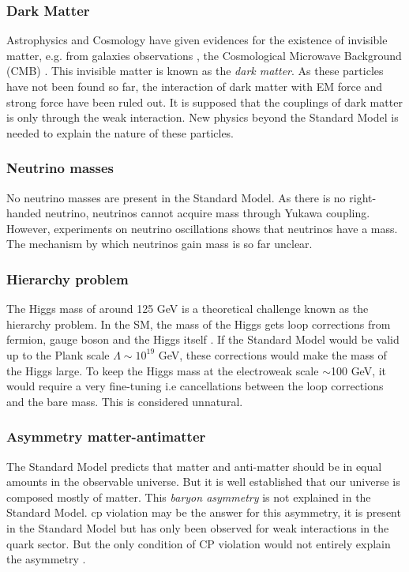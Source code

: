 \subsubsection*{Dark Matter}

Astrophysics and Cosmology have given evidences for the existence of invisible matter, e.g. from galaxies observations \cite{Battistelli:2017zrp}, the Cosmological Microwave Background (CMB) \cite{Giesen:2012rp}. This invisible matter is known as the \textit{dark matter}. As these particles have not been found so far, the interaction of dark matter with EM force and strong force have been ruled out. It is supposed that the couplings of dark matter is only through the weak interaction. New physics beyond the Standard Model is needed to explain the nature of these particles.

\subsubsection*{Neutrino masses}

No neutrino masses are present in the Standard Model. As there is no right-handed neutrino, neutrinos cannot acquire mass through Yukawa coupling. However, experiments on neutrino oscillations \cite{Dore:2008dp} shows that neutrinos have a mass. The mechanism by which neutrinos gain mass is so far unclear.

\subsubsection*{Hierarchy problem}

The Higgs mass of around 125 GeV is a theoretical challenge known as the hierarchy problem. In the SM, the mass of the Higgs gets loop corrections from fermion, gauge boson and the Higgs itself \cite{Vieira:2012ex}. If the Standard Model would be valid up to the Plank scale $\Lambda \sim 10^{19}$ GeV, these corrections would make the mass of the Higgs large. To keep the Higgs mass at the electroweak scale $\sim$100 GeV, it would require a very fine-tuning i.e cancellations between the loop corrections and the bare mass. This is considered unnatural.

\subsubsection*{Asymmetry matter-antimatter}

The Standard Model predicts that matter and anti-matter should be in equal amounts in the observable universe. But it is well established that our universe is composed mostly of matter. This \textit{baryon asymmetry} is not explained in the Standard Model. \acrshort{cp} violation \cite{Ellis:1978hq} may be the answer for this asymmetry, it is present in the Standard Model but has only been observed for weak interactions in the quark sector. But the only condition of CP violation would not entirely explain the asymmetry \cite{Sakharov:1967dj}.\\[0.3cm]


